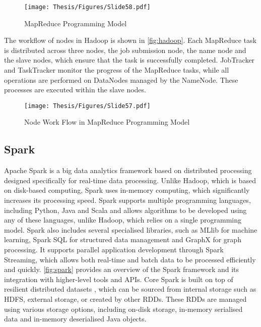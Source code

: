 \begin{figure}[h]
\centering
\texttt{[image: Thesis/Figures/Slide58.pdf]}
\caption{\label{fig:MapReduce}MapReduce Programming
Model \cite{ketu2020performance}}
\end{figure}

The workflow of nodes in Hadoop is shown in \autoref{fig:hadoop}. Each MapReduce task is distributed across three nodes, the job submission node, the name node and the slave nodes, which ensure that the task is successfully completed. JobTracker and TaskTracker monitor the progress of the MapReduce tasks, while all operations are performed on DataNodes managed by the NameNode. These processes are executed within the slave nodes. \cite{ketu2020performance}

\begin{figure}[h]
\centering
\texttt{[image: Thesis/Figures/Slide57.pdf]}
\caption{\label{fig:hadoop}Node Work Flow in MapReduce Programming
Model \cite{ketu2020performance}}
\end{figure}

\subsection{Spark}

Apache Spark is a big data analytics framework based on distributed processing designed specifically for real-time data processing. Unlike Hadoop, which is based on disk-based computing, Spark uses in-memory computing, which significantly increases its processing speed. Spark supports multiple programming languages, including Python, Java and Scala and allows algorithms to be developed using any of these languages, unlike Hadoop, which relies on a single programming model. Spark also includes several specialised libraries, such as MLlib for machine learning, Spark SQL for structured data management and GraphX for graph processing. It supports parallel application development through Spark Streaming, which allows both real-time and batch data to be processed efficiently and quickly. \autoref{fig:spark} provides an overview of the Spark framework and its integration with higher-level tools and APIs. Core Spark is built on top of resilient distributed datasets , which can be sourced from internal storage such as HDFS, external storage, or created by other RDDs. These RDDs are managed using various storage options, including on-disk storage, in-memory serialised data and in-memory deserialised Java objects. \cite{ketu2020performance}

